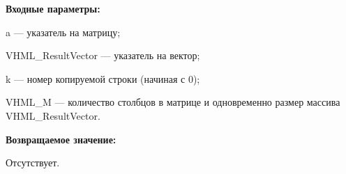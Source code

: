 \textbf{Входные параметры:}  
 
a --- указатель на матрицу;
 
VHML\_ResultVector --- указатель на вектор;
 
k --- номер копируемой строки (начиная с 0);
 
VHML\_M --- количество столбцов в матрице и одновременно размер массива VHML\_ResultVector.

\textbf{Возвращаемое значение:}

Отсутствует.
